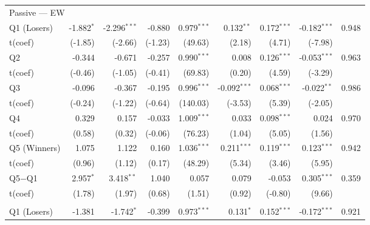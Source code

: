 \begin{table}[!htbp]
{\begin{tabular*}{\linewidth}{@{\extracolsep{\fill}}lrrrrrrrr}
\midrule
\multicolumn{9}{l}{Passive --- EW}\\
\hspace{1em}Q1 (Losers) & -1.882$^{*}$ & -2.296$^{***}$ & -0.880 & 0.979$^{***}$ & 0.132$^{**}$ & 0.172$^{***}$ & -0.182$^{***}$ & 0.948\\
\hspace{1em}t(coef) & (-1.85) & (-2.66) & (-1.23) & (49.63) & (2.18) & (4.71) & (-7.98) & \\
\hspace{1em}Q2 & -0.344 & -0.671 & -0.257 & 0.990$^{***}$ & 0.008 & 0.126$^{***}$ & -0.053$^{***}$ & 0.963\\
\hspace{1em}t(coef) & (-0.46) & (-1.05) & (-0.41) & (69.83) & (0.20) & (4.59) & (-3.29) & \\
\hspace{1em}Q3 & -0.096 & -0.367 & -0.195 & 0.996$^{***}$ & -0.092$^{***}$ & 0.068$^{***}$ & -0.022$^{**}$ & 0.986\\
\hspace{1em}t(coef) & (-0.24) & (-1.22) & (-0.64) & (140.03) & (-3.53) & (5.39) & (-2.05) & \\
\hspace{1em}Q4 & 0.329 & 0.157 & -0.033 & 1.009$^{***}$ & 0.033 & 0.098$^{***}$ & 0.024 & 0.970\\
\hspace{1em}t(coef) & (0.58) & (0.32) & (-0.06) & (76.23) & (1.04) & (5.05) & (1.56) & \\
\hspace{1em}Q5 (Winners) & 1.075 & 1.122 & 0.160 & 1.036$^{***}$ & 0.211$^{***}$ & 0.119$^{***}$ & 0.123$^{***}$ & 0.942\\
\hspace{1em}t(coef) & (0.96) & (1.12) & (0.17) & (48.29) & (5.34) & (3.46) & (5.95) & \\
\hspace{1em}Q5$-$Q1 & 2.957$^{*}$ & 3.418$^{**}$ & 1.040 & 0.057 & 0.079 & -0.053 & 0.305$^{***}$ & 0.359\\
\hspace{1em}t(coef) & (1.78) & (1.97) & (0.68) & (1.51) & (0.92) & (-0.80) & (9.66) & \\
\addlinespace[0.3em]
\hline
\multicolumn{9}{l}{Passive --- VW}\\
\hspace{1em}Q1 (Losers) & -1.381 & -1.742$^{*}$ & -0.399 & 0.973$^{***}$ & 0.131$^{*}$ & 0.152$^{***}$ & -0.172$^{***}$ & 0.921\\

\end{tabular*}}
\end{table}
